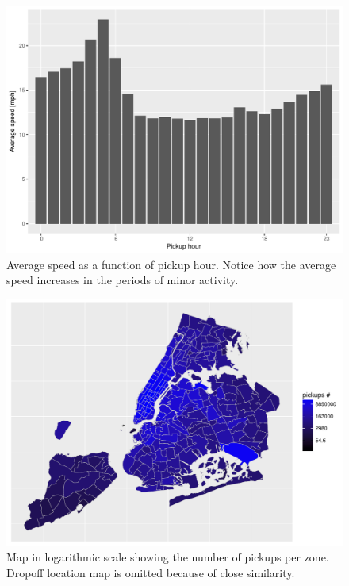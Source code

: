 \documentclass{acm_proc_article-sp-sigmod09}
\begin{document}
\begin{figure}
	\centering
	\includegraphics[width=1\columnwidth]{resources/base_plots/avg_speed_by_pickup_hour_dist.pdf}
	\caption{Average speed as a function of pickup hour. Notice how the average speed increases in the periods of minor activity.}
	\label{fig:speedByHour}
\end{figure}

\begin{figure}
	\centering
	\includegraphics[width=1\columnwidth]{resources/base_plots/pickup_location_id_dist_map.pdf}
	\caption{Map in logarithmic scale showing the number of pickups per zone. Dropoff location map is omitted because of close similarity.}
	\label{fig:pickupDistributionMap}
\end{figure}
\end{document}
